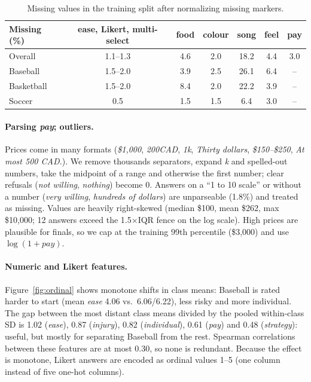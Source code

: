 \begin{table}[htbp]
\centering\small
\begin{tabular}{lcccccc}
\toprule
Missing (\%) & ease, Likert, multi-select & food & colour & song & feel & pay \\
\midrule
Overall    & 1.1--1.3 & 4.6 & 2.0 & 18.2 & 4.4 & 3.0 \\
Baseball   & 1.5--2.0 & 3.9 & 2.5 & 26.1 & 6.4 & -- \\
Basketball & 1.5--2.0 & 8.4 & 2.0 & 22.2 & 3.9 & -- \\
Soccer     & 0.5      & 1.5 & 1.5 & 6.4  & 3.0 & -- \\
\bottomrule
\end{tabular}
\caption{Missing values in the training split after normalizing missing markers.}
\label{tab:missing}
\end{table}

\paragraph{Parsing \emph{pay}; outliers.}
Prices come in many formats (\emph{\$1,000}, \emph{200CAD}, \emph{1k},
\emph{Thirty dollars}, \emph{\$150--\$250}, \emph{At most 500 CAD.}). We remove
thousands separators, expand \emph{k} and spelled-out numbers, take the midpoint
of a range and otherwise the first number; clear refusals (\emph{not willing},
\emph{nothing}) become 0. Answers on a ``1 to 10 scale'' or without a number
(\emph{very willing}, \emph{hundreds of dollars}) are unparseable (1.8\%) and
treated as missing. Values are heavily right-skewed (median \$100, mean \$262,
max \$10{,}000; 12 answers exceed the 1.5$\times$IQR fence on the log scale).
High prices are plausible for finals, so we cap at the training 99th percentile
(\$3{,}000) and use $\log(1+\textit{pay})$.

\paragraph{Numeric and Likert features.}
Figure~\ref{fig:ordinal} shows monotone shifts in class means: Baseball is rated
harder to start (mean \emph{ease} 4.06 vs.\ 6.06/6.22), less risky and more
individual. The gap between the most distant class means divided by the pooled
within-class SD is 1.02 (\emph{ease}), 0.87 (\emph{injury}), 0.82
(\emph{individual}), 0.61 (\emph{pay}) and 0.48 (\emph{strategy}): useful, but
mostly for separating Baseball from the rest. Spearman correlations between
these features are at most 0.30, so none is redundant. Because the effect is
monotone, Likert answers are encoded as ordinal values 1--5 (one column instead
of five one-hot columns).

